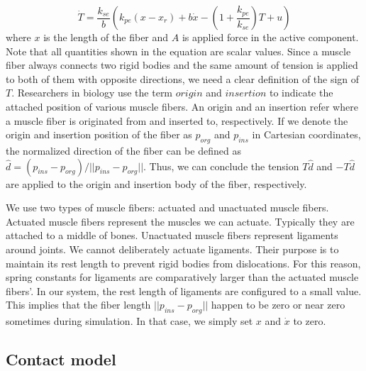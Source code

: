 \documentclass[a4paper,10pt]{article}
\begin{document}
\begin{equation}\label{Tension}
\dot{T} = \frac{k_{se}}{b} \left( k_{pe}(x-x_{r})+b\dot{x}-\left(1+\frac{k_{pe}}{k_{se}}\right)T+u   \right)
\end{equation}
where $x$ is the length of the fiber and $A$ is applied force in the active
component. Note that all quantities shown in the equation are scalar values.
Since a muscle fiber always connects two rigid bodies and the same amount of
tension is applied to both of them with opposite directions,
we need a clear definition of the sign of $T$. Researchers in biology
use the term $origin$ and $insertion$ to indicate the attached position
of various muscle fibers. An origin and an insertion refer where a muscle
fiber is originated from and inserted to, respectively.
If we denote the origin and insertion position of the fiber
as $p_{org}$ and $p_{ins}$ in Cartesian coordinates, the normalized direction of the fiber can be
defined as $\hat{d}=(p_{ins}-p_{org})/||p_{ins}-p_{org}||$. Thus, we can conclude
the tension $T\hat{d}$ and $-T\hat{d}$ are applied to the origin and insertion body
of the fiber, respectively.

We use two types of muscle fibers: actuated and unactuated muscle fibers.
Actuated muscle fibers represent the muscles we can actuate. Typically
they are attached to a middle of bones. Unactuated muscle fibers represent
ligaments around joints. We cannot deliberately actuate ligaments. Their
purpose is to maintain its rest length to prevent rigid bodies from
dislocations. For this reason, spring constants for ligaments are
comparatively larger than the actuated muscle fibers'.
In our system, the rest length of ligaments are configured to a small value.
This implies that the fiber length $||p_{ins}-p_{org}||$ happen to be zero
or near zero sometimes during simulation. In that case, we simply set
$x$ and $\dot{x}$ to zero.

\subsection{Contact model}
\end{document}

